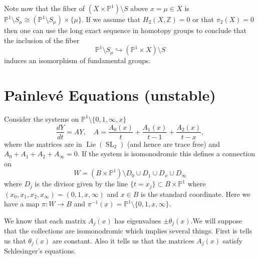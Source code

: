 \documentclass[12pt]{book}
\numberwithin{equation}{section}
\theoremstyle{definition}
\theoremstyle{remark}
\newcommand{\ZZ}{\mathbb{Z}}
\newcommand{\PP}{\mathbb{P}}
\newcommand{\SL}{\operatorname{SL}}
\newcommand{\Lie}{\operatorname{Lie}}
\begin{document}
Note now that the fiber of $(X\times \PP^1)\setminus S$ above $x=\mu\in X$ is $\PP^1\setminus S_{\mu} \cong (\PP^1\setminus S_{\mu}) \times \lbrace \mu \rbrace$.
If we assume that $H_2(X,\ZZ)=0$ or that $\pi_2(X)=0$ then one can use the long exact sequence in homotopy groups to conclude that the inclusion of the fiber 
 $$ \PP^1\setminus S_{\mu} \hookrightarrow (\PP^1\times X)\setminus S $$
induces an isomorphism of fundamental groups.

\fi

\section{Painlev\'e Equations (unstable)}

Consider the systems on $\PP^1\setminus \lbrace 0,1,\infty,x\rbrace$ 
$$ \dfrac{dY}{dt} = AY, \quad A = \frac{A_0(x)}{t}+\frac{A_1(x)}{t-1}+ \frac{A_2(x)}{t-x},$$
where the matrices are in $\Lie(\SL_2)$ (and hence are trace free) and  $A_0+A_1+A_2+A_{\infty}=0$.
If the system is isomonodromic this defines a connection on 
$$W=(B\times \PP^1)\setminus D_0\cup D_1 \cup D_x \cup D_{\infty}$$ 
where $D_j$ is the divisor given by the line $\lbrace t = x_j \rbrace \subset B\times \PP^1$ where $(x_0,x_1,x_2,x_{\infty}) = (0,1,x,\infty)$ and $x\in B$ is the standard coordinate.
Here we have a map $\pi\colon W\to B$ and $\pi^{-1}(x) = \PP^1\setminus \lbrace 0,1,x,\infty\rbrace$.

We know that each matrix $A_j(x)$ has eigenvalues $\pm \theta_j(x)$.We will suppose that the collections are isomonodromic which implies several things.
First is tells us that $\theta_j(x)$ are constant. 
Also it tells us that the matrices $A_j(x)$ satisfy Schlesinger's equations. 
\end{document}
